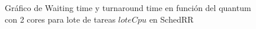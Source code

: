\begin{figure}[H]
\hfill
{}
\hfill
{}
\hfill
\caption{Gráfico de Waiting time y turnaround time en función del quantum con 2 cores para lote de tareas $loteCpu$ en SchedRR}
\end{figure}

